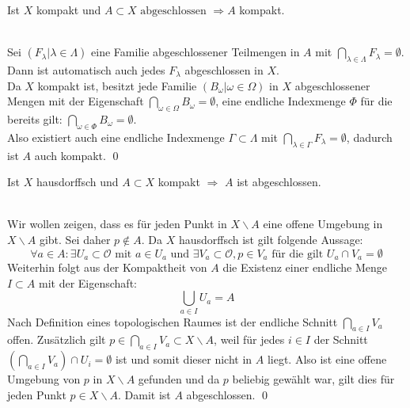 \begin{Satz}\label{satz:abgeschlkomp}
		Ist \(X\) kompakt und \(A \subset X \mbox{ abgeschlossen } \Rightarrow A\) kompakt.
\end{Satz}
%
	\\
 	Sei \((F_{\lambda} | \lambda \in \Lambda) \) eine Familie abgeschlossener Teilmengen in \(A\) mit \( \bigcap_{\lambda \in \Lambda } F_{\lambda} = \emptyset \).\\
	Dann ist automatisch auch jedes \(F_{\lambda} \) abgeschlossen in \(X\).\\
	Da \(X\) kompakt ist, besitzt jede Familie \((B_{\omega} | \omega \in \Omega) \) in \(X\) abgeschlossener Mengen mit der Eigenschaft 
	\( \bigcap_{\omega \in \Omega} B_{\omega} = \emptyset\), eine 
	endliche Indexmenge \(\Phi \) für die bereits gilt: \( \bigcap_{\omega \in \Phi} B_{\omega} = \emptyset\).\\
	Also existiert auch eine endliche Indexmenge \( \Gamma \subset \Lambda \) mit \( \bigcap_{\lambda \in \Gamma } F_{\lambda} = \emptyset \), dadurch ist 
	\(A\) auch kompakt.
\qed
		
\begin{Satz}\label{satz:kompabgeschl}
	Ist \(X\) hausdorffsch und \(A \subset X \) kompakt \( \Rightarrow \) \(A\) ist abgeschlossen.
\end{Satz}
%
	\\
	Wir wollen zeigen, dass es für jeden Punkt in \(X \backslash A \) eine offene Umgebung in \(X \backslash A \) gibt. Sei daher \(p \notin A \).
	Da \(X\) hausdorffsch ist gilt folgende Aussage:
	\[ \forall a \in A : \exists U_{a} \subset \mathcal{O} \mbox{ mit }  a \in U_{a} \mbox{ und } \exists V_{a}\subset \mathcal{O}, p \in V_{a} 
		 \mbox{ für die gilt } U_{a} \cap V_{a} = \emptyset \] 
	Weiterhin folgt aus der Kompaktheit von \(A\) die Existenz einer endliche Menge \(I \subset A\) mit der Eigenschaft:
	\[ \bigcup_{a \in I} U_{a} = A \]
	Nach Definition eines topologischen Raumes ist der endliche Schnitt \(\bigcap_{a \in I} V_{a}\) offen. Zusätzlich gilt 
	\(p \in \bigcap_{a \in I} V_{a} \subset  X\backslash A \), weil für jedes \(i \in I\) der Schnitt \( ( \bigcap_{a \in I} V_a ) \cap U_i = \emptyset \) ist und 
	somit dieser nicht in \(A\) liegt.
	Also ist eine offene Umgebung von \(p\) in \(X\backslash A\) gefunden und da \(p\) beliebig gewählt war, gilt dies für 
	jeden Punkt \(p \in X\backslash A\). Damit ist \(A\) abgeschlossen. 
\qed
	
